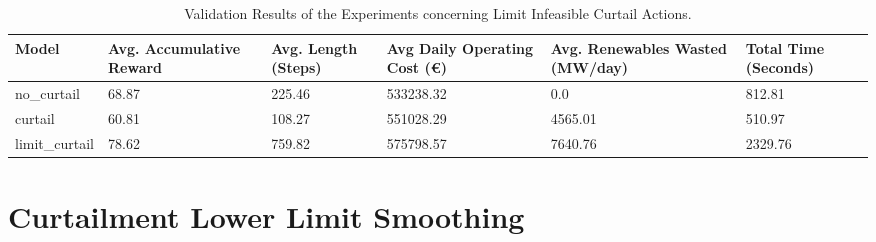 \begin{table}[ht]
	\centering
	\begin{tabularx}{\textwidth}{|l|X|X|X|X|X|}
		\hline
		\textbf{Model} & \textbf{Avg. Accumulative Reward}& \textbf{Avg. Length (Steps)} & \textbf{Avg Daily Operating Cost (€)} & \textbf{Avg. Renewables Wasted (MW/day)} & \textbf{Total Time (Seconds)}\\
		\hline
		no\_curtail & 68.87 & 225.46 & 533238.32 & 0.0 & 812.81\\
		curtail & 60.81 & 108.27 & 551028.29 & 4565.01 & 510.97 \\
		limit\_curtail & 78.62 & 759.82 & 575798.57 & 7640.76 & 2329.76 \\
		\hline
	\end{tabularx}
	\caption{Validation Results of the Experiments concerning Limit Infeasible Curtail Actions.}
	\label{fig:curtail-val}
\end{table}

\section{Curtailment Lower Limit Smoothing}

